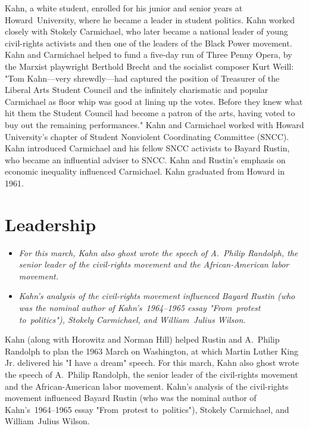 Kahn, a white student, enrolled for his junior and senior years at
Howard~University, where he became a leader in student politics. Kahn
worked closely with Stokely Carmichael, who later became a national
leader of young civil-rights activists and then one of the leaders of
the Black Power movement. Kahn and Carmichael helped to fund a five-day
run of Three Penny Opera, by the Marxist playwright Berthold Brecht and
the socialist composer Kurt Weill: "Tom Kahn---very shrewdly---had
captured the position of Treasurer of the Liberal Arts Student Council
and the infinitely charismatic and popular Carmichael as floor whip was
good at lining up the votes. Before they knew what hit them the Student
Council had become a patron of the arts, having voted to buy out the
remaining performances." Kahn and Carmichael worked with Howard
University's chapter of Student Nonviolent Coordinating Committee
(SNCC). Kahn introduced Carmichael and his fellow SNCC activists to
Bayard Rustin, who became an influential adviser to SNCC. Kahn and
Rustin's emphasis on economic inequality influenced Carmichael. Kahn
graduated from Howard in 1961.

\section{Leadership}\label{leadership}

\begin{itemize}
\item
  \emph{For this march, Kahn also ghost wrote the speech of A.~Philip
  Randolph, the senior leader of the civil-rights movement and the
  African-American labor movement.}
\item
  \emph{Kahn's analysis of the civil-rights movement influenced Bayard
  Rustin (who was the nominal author of Kahn's~1964--1965 essay
  "From~protest to~politics"), Stokely Carmichael, and William~Julius
  Wilson.}
\end{itemize}

Kahn (along with Horowitz and Norman Hill) helped Rustin and A.~Philip
Randolph to plan the 1963 March on Washington, at which Martin Luther
King Jr. delivered his "I have a dream" speech. For this march, Kahn
also ghost wrote the speech of A.~Philip Randolph, the senior leader of
the civil-rights movement and the African-American labor movement.
Kahn's analysis of the civil-rights movement influenced Bayard Rustin
(who was the nominal author of Kahn's~1964--1965 essay "From~protest
to~politics"), Stokely Carmichael, and William~Julius Wilson.

